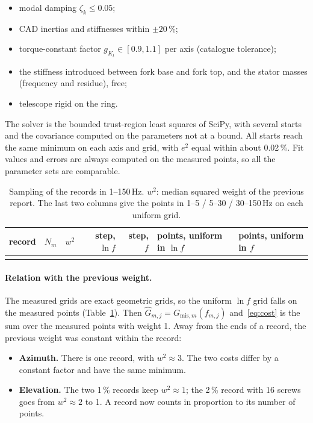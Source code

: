 \documentclass[10pt,a4paper]{article}
\numberwithin{equation}{section}
\begin{document}
\begin{itemize}
\item modal damping $\zeta_k\leq0.05$;
\item CAD inertias and stiffnesses within $\pm20$\,\%;
\item torque-constant factor $g_{K_t}\in[0.9,1.1]$ per axis (catalogue tolerance);
\item the stiffness introduced between fork base and fork top, and the stator masses (frequency and residue), free;
\item telescope rigid on the ring.
\end{itemize}
The solver is the bounded trust-region least squares of SciPy, with several starts and the covariance computed on the parameters not at a bound. All starts reach the same minimum on each axis and grid, with $e^2$ equal within about 0.02\,\%. Fit values and errors are always computed on the measured points, so all the parameter sets are comparable.

\begin{table}[H]\centering\footnotesize\setlength{\tabcolsep}{4pt}
\caption{Sampling of the records in 1--150\,Hz. $w^2$: median squared weight of the previous report. The last two columns give the points in 1--5 / 5--30 / 30--150\,Hz on each uniform grid.}\label{tab:sampling}
\begin{tabular}{lrrrrll}\toprule
record & $N_m$ & $w^2$ & step, $\ln f$ & step, $f$ & points, uniform in $\ln f$ & points, uniform in $f$ \\ \midrule
\\ \bottomrule
\end{tabular}\end{table}

\paragraph{Relation with the previous weight.} The measured grids are exact geometric grids, so the uniform $\ln f$ grid falls on the measured points (Table~\ref{tab:sampling}). Then $\hat G_{m,j}=G_{\mathrm{mis},m}(f_{m,j})$ and~\eqref{eq:cost} is the sum over the measured points with weight 1. Away from the ends of a record, the previous weight was constant within the record:
\begin{itemize}
\item \textbf{Azimuth.} There is one record, with $w^2\approx3$. The two costs differ by a constant factor and have the same minimum.
\item \textbf{Elevation.} The two 1\,\% records keep $w^2\approx1$; the 2\,\% record with 16 screws goes from $w^2\approx2$ to 1. A record now counts in proportion to its number of points.
\end{itemize}
\end{document}
